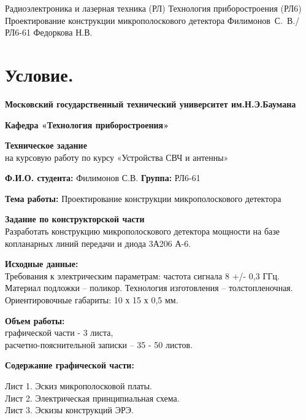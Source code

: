 \documentclass{bmstu}
\begin{document}
	\makecourseworktitle
	{Радиоэлектроника и лазерная техника (РЛ)} %
	{Технология приборостроения (РЛ6)} %
	{Проектирование конструкции микрополоскового детектора} %
	{Филимонов~С.~В./РЛ6-61} %
	{Федоркова Н.В.} %
	{}
	
	\tableofcontents
	
	\chapter{Условие.}
	
	\begin{center}
	\textbf{Московский государственный технический университет им.Н.Э.Баумана}
	
	\textbf{Кафедра «Технология приборостроения»}
	
	\textbf{Техническое задание} \\
	на курсовую работу по курсу «Устройства СВЧ и антенны»
	\end{center}
	
\noindent \textbf{Ф.И.О. студента:}  Филимонов С.В.
\noindent \textbf{Группа:}     РЛ6-61
	
\noindent \textbf{Тема работы:}  Проектирование конструкции микрополоскового детектора
	
\noindent \textbf{Задание по конструкторской части} \\
\indent Разработать конструкцию микрополоскового детектора мощности на базе копланарных линий передачи и диода 3А206 А-6.
	
\noindent \textbf{Исходные данные:}\\
\indent Требования к электрическим параметрам: частота сигнала 8 +/- 0,3 ГГц. Материал подложки – поликор. Технология изготовления – толстопленочная. Ориентировочные габариты: 10 х 15 х 0,5 мм.
	
\noindent \textbf{Объем работы:} \\
\indent графической части -  3 листа,\\
\indent расчетно-пояснительной записки – 35 - 50 листов.
	
\noindent \textbf{Содержание графической части:}
	
\indent Лист 1. Эскиз микрополосковой платы.\\
\indent Лист 2. Электрическая принципиальная схема.\\ 
\indent Лист 3. Эскизы конструкций ЭРЭ.
	
\end{document}
